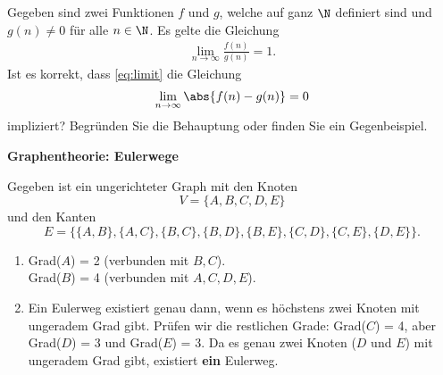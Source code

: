 \begin{questions}
\droptotalpoints

\question[1]
Gegeben sind zwei Funktionen $f$ und $g$, welche auf ganz $\N$ definiert sind und $g(n) \neq 0$ für alle $n\in\N$. Es gelte die Gleichung
\begin{align}\label{eq:limit}
  \lim_{n\to\infty}\frac{f(n)}{g(n)} = 1.
\end{align}
Ist es korrekt, dass \cref{eq:limit} die Gleichung
\begin{align*}
  \lim_{n\to\infty} \abs{f(n) - g(n)} = 0
\end{align*}
impliziert? Begründen Sie die Behauptung oder finden Sie ein Gegenbeispiel.

\clearpage

\question
\textbf{Graphentheorie: Eulerwege}

Gegeben ist ein ungerichteter Graph mit den Knoten
\[
	V = \{A, B, C, D, E\}
\]
und den Kanten
\[
	E = \{\{A,B\}, \{A,C\}, \{B,C\}, \{B,D\}, \{B,E\}, \{C,D\}, \{C,E\}, \{D,E\}\}.
\]

\droptotalpoints

\begin{solution}
\begin{enumerate}
	\item Grad($A$) = 2 (verbunden mit $B, C$). \\
	Grad($B$) = 4 (verbunden mit $A, C, D, E$).
	\item Ein Eulerweg existiert genau dann, wenn es höchstens zwei Knoten mit ungeradem Grad gibt.
	Prüfen wir die restlichen Grade:
	Grad($C$) = 4, aber Grad($D$) = 3 und Grad($E$) = 3.
	Da es genau zwei Knoten ($D$ und $E$) mit ungeradem Grad gibt, existiert \textbf{ein} Eulerweg.
\end{enumerate}
\end{solution}


\end{questions}
